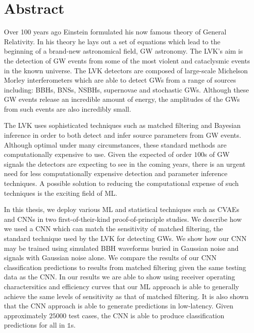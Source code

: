 \chapter{Abstract}

Over 100 years ago Einstein formulated his now famous theory of 
General Relativity. In his theory he lays out a set of equations 
which lead to the beginning of a brand-new 
astronomical field, \ac{GW} astronomy. The \ac{LVK}'s
aim is the detection of \ac{GW} events from some of the most violent 
and cataclysmic events 
in the known universe. The \ac{LVK} detectors are composed of 
large-scale Michelson Morley interferometers which are able to detect 
\acp{GW} from a range 
of sources including: \acp{BBH}, \acp{BNS}, 
\acp{NSBH}, supernovae and stochastic \acp{GW}. 
Although these \ac{GW} events release an incredible amount of 
energy, the amplitudes of the \acp{GW} from such events 
are also incredibly small. 

The \ac{LVK} uses sophisticated techniques such as matched 
filtering and Bayesian inference in order 
to both detect and infer source parameters 
from \ac{GW} events. Although optimal under many 
circumstances, these standard methods are computationally 
expensive to use. Given the expected of order $100$s of \ac{GW} 
signals the detectors are expecting to see in the coming years, there 
is an urgent need for less computationally expensive detection and 
parameter inference techniques. A possible solution to reducing the computational 
expense of such techniques is the exciting field of \ac{ML}.

%
%
In this thesis, we deploy 
various \ac{ML} and statistical techniques such as 
\acp{CVAE} and \acp{CNN} in two first-of-their-kind proof-of-principle 
studies. We describe how we used 
a \ac{CNN} which can match the sensitivity of matched 
filtering, the standard technique used by the \ac{LVK} 
for detecting \acp{GW}. We show how our \ac{CNN} may be trained using 
simulated \ac{BBH} waveforms buried in Gaussian noise 
and signals with Gaussian noise alone. We compare the results 
of our \ac{CNN} classification predictions to results from 
matched filtering given the same testing data as the 
\ac{CNN}. In our results we are able to show using receiver 
operating charactersitics and efficiency curves that our \ac{ML} approach 
is able to generally achieve the same levels of sensitivity as that of 
matched filtering. It is also shown that the \ac{CNN} approach is 
able to generate predictions in low-latency. Given approximately $25000$ test cases,  
the \ac{CNN} is able to produce classification predictions for all in $\mathds{1}$s.

